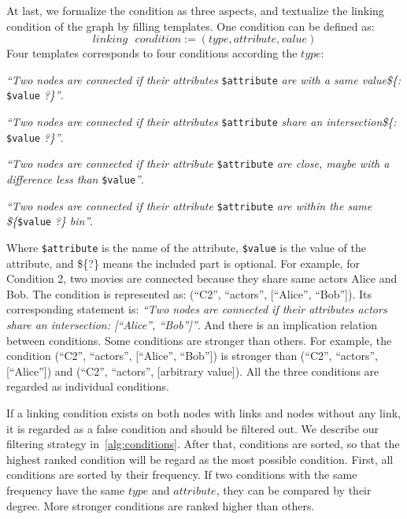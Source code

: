 At last, we formalize the condition as three aspects, and textualize the linking condition of the graph by filling templates. 
One condition can be defined as:
\begin{equation}
    linking\text{ }condition := ( type, attribute, value )
\end{equation}
Four templates corresponds to four conditions according the $type$:
\begin{compactenum}[\textbf{C}1]
    \item \textit{``Two nodes are connected if their attributes} \texttt{\$attribute} \textit{are with a same value\$\{: }\texttt{\$value} \textit{?\}''}.
    \item \textit{``Two nodes are connected if their attributes} \texttt{\$attribute} \textit{share an intersection\$\{: }\texttt{\$value} \textit{?\}''}.
    \item \textit{``Two nodes are connected if their attribute} \texttt{\$attribute} \textit{are close, maybe with a difference less than } \texttt{\$value}\textit{''}.
    \item \textit{``Two nodes are connected if their attribute} \texttt{\$attribute} \textit{are within the same \$\{}\texttt{\$value}\textit{ ?\} bin''}.
\end{compactenum}

Where \texttt{\$attribute} is the name of the attribute, \texttt{\$value} is the value of the attribute, and \$\{?\} means the included part is optional. 
For example, for Condition 2, two movies are connected because they share same actors Alice and Bob. 
The condition is represented as: (``C2'', ``actors'', [``Alice'', ``Bob'']). 
Its corresponding statement is: \textit{``Two nodes are connected if their attributes actors share an intersection: [``Alice'', ``Bob'']''}. 
And there is an implication relation between conditions.
Some conditions are stronger than others.
For example, the condition (``C2'', ``actors'', [``Alice'', ``Bob'']) is stronger than (``C2'', ``actors'', [``Alice'']) and (``C2'', ``actors'', [arbitrary value]).
All the three conditions are regarded as individual conditions.

If a linking condition exists on both nodes with links and nodes without any link, it is regarded as a false condition and should be filtered out.
We describe our filtering strategy in~\ref{alg:conditions}.
After that, conditions are sorted, so that the highest ranked condition will be regard as the most possible condition.
First, all conditions are sorted by their frequency.
If two conditions with the same frequency have the same $type$ and $attribute$, they can be compared by their degree.
More stronger conditions are ranked higher than others.


